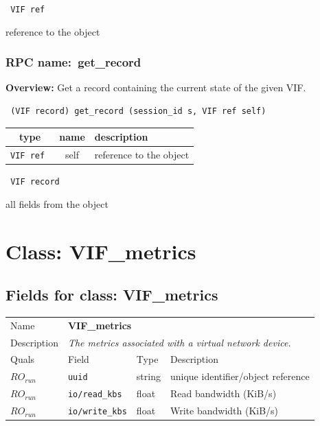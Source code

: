 {\tt 
VIF ref
}


reference to the object
\vspace{0.3cm}
\vspace{0.3cm}
\vspace{0.3cm}
\subsubsection{RPC name:~get\_record}

{\bf Overview:} 
Get a record containing the current state of the given VIF.

\begin{verbatim} (VIF record) get_record (session_id s, VIF ref self)\end{verbatim}



 
\vspace{0.3cm}
\begin{tabular}{|c|c|p{7cm}|}
 \hline
{\bf type} & {\bf name} & {\bf description} \\ \hline
{\tt VIF ref } & self & reference to the object \\ \hline 

\end{tabular}

\vspace{0.3cm}

{\tt 
VIF record
}


all fields from the object
\vspace{0.3cm}
\vspace{0.3cm}
\vspace{0.3cm}

\vspace{1cm}
\newpage
\section{Class: VIF\_metrics}
\subsection{Fields for class: VIF\_metrics}
\begin{longtable}{|lllp{}|}
\hline
\multicolumn{1}{|l}{Name} & \multicolumn{3}{l|}{\bf VIF\_metrics} \\
\multicolumn{1}{|l}{Description} & \multicolumn{3}{l|}{\parbox{11cm}{\em
The metrics associated with a virtual network device.}} \\
\hline
Quals & Field & Type & Description \\
\hline
$\mathit{RO}_\mathit{run}$ &  {\tt uuid} & string & unique identifier/object reference \\
$\mathit{RO}_\mathit{run}$ &  {\tt io/read\_kbs} & float & Read bandwidth (KiB/s) \\
$\mathit{RO}_\mathit{run}$ &  {\tt io/write\_kbs} & float & Write bandwidth (KiB/s) \\
\hline
\end{longtable}
